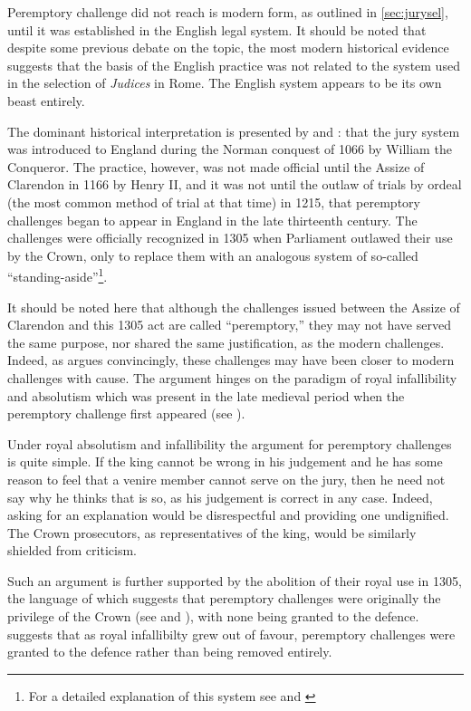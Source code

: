 Peremptory challenge did not reach is modern form, as outlined in \ref{sec:jurysel}, until it was established in the English legal
system. It should be noted that despite some previous debate on the topic, the most modern historical evidence suggests that the
basis of the English practice was not related to the system used in the selection of \textit{Judices} in Rome. The English system
appears to be its own beast entirely.

The dominant historical interpretation is presented by \cite{vonmosch1921} and \cite{hoffman1997}: that the jury system was
introduced to England during the Norman conquest of 1066 by William the Conqueror. The practice, however, was not made official
until the Assize of Clarendon in 1166 by Henry II, and it was not until the outlaw of trials by ordeal (the most common method of
trial at that time) in 1215, that peremptory challenges began to appear in England in the late thirteenth century. The challenges
were officially recognized in 1305 when Parliament outlawed their use by the Crown, only to replace them with an analogous system
of so-called ``standing-aside''\footnote{For a detailed explanation of this system see \cite{hoffman1997} and \cite{brown2000}}. 

It should be noted here that although the challenges issued between the Assize of Clarendon and this 1305 act are called
``peremptory,'' they may not have served the same purpose, nor shared the same justification, as the modern challenges. Indeed, as
\cite{hoffman1997} argues convincingly, these challenges may have been closer to modern challenges with cause. The argument hinges 
on the paradigm of royal infallibility and absolutism which was present in the late medieval period when the peremptory challenge
first appeared (see \cite{burgess1992}).

Under royal absolutism and infallibility the argument for peremptory challenges is quite simple. If the king cannot be wrong in
his judgement and he has some reason to feel that a venire member cannot serve on the jury, then he need not say why he thinks
that is so, as his judgement is correct in any case. Indeed, asking for an explanation would be disrespectful and providing one
undignified. The Crown prosecutors, as representatives of the king, would be similarly shielded from criticism.

Such an argument is further supported by the abolition of their royal use in 1305, the language of which suggests that peremptory
challenges were originally the privilege of the Crown (see \cite{hoffman1997} and \cite{vandykejurysel}), with none being granted
to the defence. \cite{hoffman1997} suggests that as  royal infallibilty grew out of favour, peremptory challenges were granted to
the defence rather than being removed entirely.

